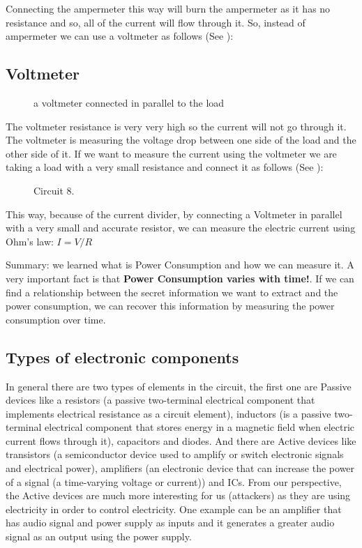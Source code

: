Connecting the ampermeter this way will burn the ampermeter as it has no
resistance and so, all of the current will flow through it. So, instead of
ampermeter we can use a voltmeter as follows (See ):

\subsection{Voltmeter}

\begin{figure}[!ht]
    \centering
    
    \caption{a voltmeter connected in parallel to the load} \label{fig:circuit7}
\end{figure}

The voltmeter resistance is very very high so the current will not go through
it. The voltmeter is measuring the voltage drop between one side of the load and
the other side of it. If we want to measure the current using the voltmeter we
are taking a load with a very small resistance and connect it as follows (See
):

\begin{figure}[!ht]
    \centering
    
    \caption{Circuit 8.} \label{fig:circuit8}
\end{figure}

This way, because of the current divider, by connecting a Voltmeter in parallel
with a very small and accurate resistor, we can measure the electric current
using Ohm's law: $I=V/R$
 
Summary: we learned what is Power Consumption and how we can measure it. A very
important fact is that \textbf{Power Consumption varies with time!}. If we can
find a relationship between the secret information we want to extract and the
power consumption, we can recover this information by measuring the power
consumption over time.

\subsection{Types of electronic components}

In general there are two types of elements in the circuit, the first one are
Passive devices like a resistors (a passive two-terminal electrical component
that implements electrical resistance as a circuit element), inductors (is a
passive two-terminal electrical component that stores energy in a magnetic field
when electric current flows through it), capacitors and diodes. And there are
Active devices like transistors (a semiconductor device used to amplify or
switch electronic signals and electrical power), amplifiers (an electronic
device that can increase the power of a signal (a time-varying voltage or
current)) and ICs. From our perspective, the Active devices are much more
interesting for us (attackers) as they are using electricity in order to control
electricity. One example can be an amplifier that has audio signal and power
supply as inputs and it generates a greater audio signal as an output using the
power supply. 

